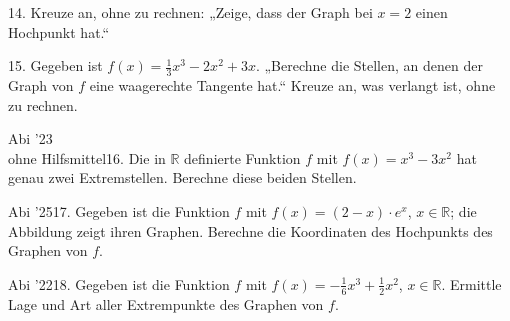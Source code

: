 \documentclass[11pt]{article}
\begin{document}
\begin{pfaufg}{}{14.}{}
Kreuze an, ohne zu rechnen: „Zeige, dass der Graph bei $x = 2$ einen Hochpunkt hat.“ 
\end{pfaufg}
\begin{pfaufg}{}{15.}{}
Gegeben ist $f(x) = \tfrac{1}{3}x^3 - 2x^2 + 3x$. „Berechne die Stellen, an denen der Graph von $f$ eine waagerechte Tangente hat.“ Kreuze an, was verlangt ist, ohne zu rechnen. 
\end{pfaufg}
\pfgruppe{}
\begin{pfaufg}{Abi ’23\\ohne Hilfsmittel}{16.}{}
Die in $\mathbb{R}$ definierte Funktion $f$ mit $f(x) = x^3 - 3x^2$ hat genau zwei Extremstellen. Berechne diese beiden Stellen.
\end{pfaufg}
\begin{pfaufg}{Abi ’25}{17.}{}
Gegeben ist die Funktion $f$ mit $f(x) = (2 - x)\cdot e^x$, $x \in \mathbb{R}$; die Abbildung zeigt ihren Graphen. Berechne die Koordinaten des Hochpunkts des Graphen von $f$.
\par\smallskip\noindent {}\par
{}
\end{pfaufg}
\begin{pfaufg}{Abi ’22}{18.}{}
Gegeben ist die Funktion $f$ mit $f(x) = -\tfrac{1}{6}x^3 + \tfrac{1}{2}x^2$, $x \in \mathbb{R}$. Ermittle Lage und Art aller Extrempunkte des Graphen von $f$.
\end{pfaufg}
\end{document}
